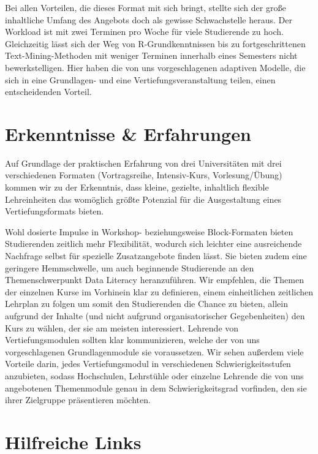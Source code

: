 \documentclass[
  letterpaper,
  DIV=11]{scrartcl}
\begin{document}
Bei allen Vorteilen, die dieses Format mit sich bringt, stellte sich der
große inhaltliche Umfang des Angebots doch als gewisse Schwachstelle
heraus. Der Workload ist mit zwei Terminen pro Woche für viele
Studierende zu hoch. Gleichzeitig lässt sich der Weg von
R-Grundkenntnissen bis zu fortgeschrittenen Text-Mining-Methoden mit
weniger Terminen innerhalb eines Semesters nicht bewerkstelligen. Hier
haben die von uns vorgeschlagenen adaptiven Modelle, die sich in eine
Grundlagen- und eine Vertiefungsveranstaltung teilen, einen
entscheidenden Vorteil.

\hypertarget{erkenntnisse-erfahrungen}{%
\section{Erkenntnisse \& Erfahrungen}\label{erkenntnisse-erfahrungen}}

Auf Grundlage der praktischen Erfahrung von drei Universitäten mit drei
verschiedenen Formaten (Vortragsreihe, Intensiv-Kurs, Vorlesung/Übung)
kommen wir zu der Erkenntnis, dass kleine, gezielte, inhaltlich flexible
Lehreinheiten das womöglich größte Potenzial für die Ausgestaltung eines
Vertiefungsformats bieten.

Wohl dosierte Impulse in Workshop- beziehungsweise Block-Formaten bieten
Studierenden zeitlich mehr Flexibilität, wodurch sich leichter eine
ausreichende Nachfrage selbst für spezielle Zusatzangebote finden lässt.
Sie bieten zudem eine geringere Hemmschwelle, um auch beginnende
Studierende an den Themenschwerpunkt Data Literacy heranzuführen. Wir
empfehlen, die Themen der einzelnen Kurse im Vorhinein klar zu
definieren, einem einheitlichen zeitlichen Lehrplan zu folgen um somit
den Studierenden die Chance zu bieten, allein aufgrund der Inhalte (und
nicht aufgrund organisatorischer Gegebenheiten) den Kurs zu wählen, der
sie am meisten interessiert. Lehrende von Vertiefungsmodulen sollten
klar kommunizieren, welche der von uns vorgeschlagenen Grundlagenmodule
sie voraussetzen. Wir sehen außerdem viele Vorteile darin, jedes
Vertiefungsmodul in verschiedenen Schwierigkeitsstufen anzubieten,
sodass Hochschulen, Lehrstühle oder einzelne Lehrende die von uns
angebotenen Themenmodule genau in dem Schwierigkeitsgrad vorfinden, den
sie ihrer Zielgruppe präsentieren möchten.

\hypertarget{hilfreiche-links}{%
\section{Hilfreiche Links}\label{hilfreiche-links}}
\end{document}
